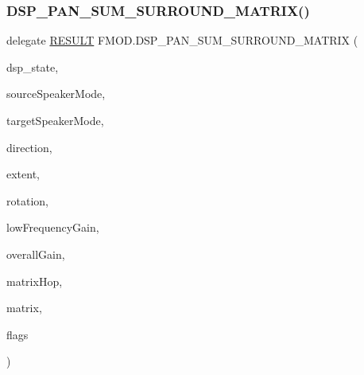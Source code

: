 \subsubsection{\texorpdfstring{D\+S\+P\+\_\+\+P\+A\+N\+\_\+\+S\+U\+M\+\_\+\+S\+U\+R\+R\+O\+U\+N\+D\+\_\+\+M\+A\+T\+R\+I\+X()}{DSP\_PAN\_SUM\_SURROUND\_MATRIX()}}
{\footnotesize\ttfamily delegate \hyperlink{namespace_f_m_o_d_a305d1176ef3f8c8815861a60407ac33d}{R\+E\+S\+U\+LT} F\+M\+O\+D.\+D\+S\+P\+\_\+\+P\+A\+N\+\_\+\+S\+U\+M\+\_\+\+S\+U\+R\+R\+O\+U\+N\+D\+\_\+\+M\+A\+T\+R\+IX (\begin{DoxyParamCaption}\item[{ref \hyperlink{struct_f_m_o_d_1_1_d_s_p___s_t_a_t_e}{D\+S\+P\+\_\+\+S\+T\+A\+TE}}]{dsp\+\_\+state,  }\item[{int}]{source\+Speaker\+Mode,  }\item[{int}]{target\+Speaker\+Mode,  }\item[{float}]{direction,  }\item[{float}]{extent,  }\item[{float}]{rotation,  }\item[{float}]{low\+Frequency\+Gain,  }\item[{float}]{overall\+Gain,  }\item[{int}]{matrix\+Hop,  }\item[{Int\+Ptr}]{matrix,  }\item[{\hyperlink{namespace_f_m_o_d_a261a23e0e5c15d202fa47817d62b512c}{D\+S\+P\+\_\+\+P\+A\+N\+\_\+\+S\+U\+R\+R\+O\+U\+N\+D\+\_\+\+F\+L\+A\+GS}}]{flags }\end{DoxyParamCaption})}

\mbox{\label{namespace_f_m_o_d_a0dc8b7058b8085af4c8a354b9313163d}} 

